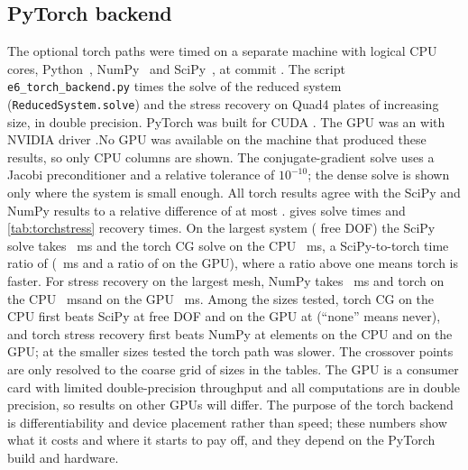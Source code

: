\subsection{PyTorch backend}\label{sec:perf:torch}
\ifnum{}
The optional torch paths were timed on a separate \torchOs{} machine with \torchCpus{} logical CPU cores, Python~\torchPython{}, NumPy~\torchNumpy{} and SciPy~\torchScipy{}, at commit \texttt{\torchCommit{}}. The script \texttt{e6\_torch\_backend.py} times the solve of the reduced system (\texttt{ReducedSystem.solve}) and the stress recovery on Quad4 plates of increasing size, in double precision. PyTorch \torchVersion{} was built for CUDA \torchCuda{}.
\ifnum{} The GPU was an \torchGpu{} with NVIDIA driver \torchDriver{}.\else\relax No GPU was available on the machine that produced these results, so only CPU columns are shown.\fi{}
The conjugate-gradient solve uses a Jacobi preconditioner and a relative tolerance of $10^{-10}$; the dense solve is shown only where the system is small enough. All torch results agree with the SciPy and NumPy results to a relative difference of at most \torchMaxDiff{}.
 gives solve times and \cref{tab:torchstress} recovery times. On the largest system (\torchBigDof{} free DOF) the SciPy solve takes \torchBigScipyMs{}~ms and the torch CG solve on the CPU \torchBigCpuMs{}~ms, a SciPy-to-torch time ratio of \torchBigCpuRatio{}\ifnum{}\relax\space(\torchBigGpuMs{}~ms and a ratio of \torchBigGpuRatio{} on the GPU)\fi{}, where a ratio above one means torch is faster.
For stress recovery on the largest mesh, NumPy takes \torchBigStressNumpyMs{}~ms and torch on the CPU \torchBigStressCpuMs{}~ms\ifnum{}\relax\space and on the GPU \torchBigStressGpuMs{}~ms\fi{}.
Among the sizes tested, torch CG on the CPU first beats SciPy at \torchCrossCpu{} free DOF and on the GPU at \torchCrossGpu{} (``none'' means never), and torch stress recovery first beats NumPy at \torchStressCrossCpuElems{} elements on the CPU and \torchStressCrossGpuElems{} on the GPU; at the smaller sizes tested the torch path was slower. The crossover points are only resolved to the coarse grid of sizes in the tables.
The GPU is a consumer card with limited double-precision throughput and all computations are in double precision, so results on other GPUs will differ. The purpose of the torch backend is differentiability and device placement rather than speed; these numbers show what it costs and where it starts to pay off, and they depend on the PyTorch build and hardware.

